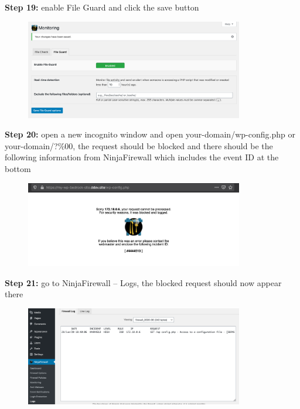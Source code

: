 \documentclass[a4paper]{article}
\begin{document}
\noindent
\textbf{Step 19:} enable File Guard and click the save button

\begin{figure}[H]
  \centering
  \includegraphics[width=0.85\textwidth]{images/20.png}
\end{figure}

\newpage

\noindent
\textbf{Step 20:} open a new incognito window and open your-domain/wp-config.php or your-domain/?\%00,
the request should be blocked and there should be the following information from NinjaFirewall
which includes the event ID at the bottom

\begin{figure}[H]
  \centering
  \includegraphics[width=0.85\textwidth]{images/21.png}
\end{figure}

\noindent
\textbf{Step 21:} go to NinjaFirewall -- Logs, the blocked request should now appear there

\begin{figure}[H]
  \centering
  \includegraphics[width=0.85\textwidth]{images/22.png}
\end{figure}
\end{document}
